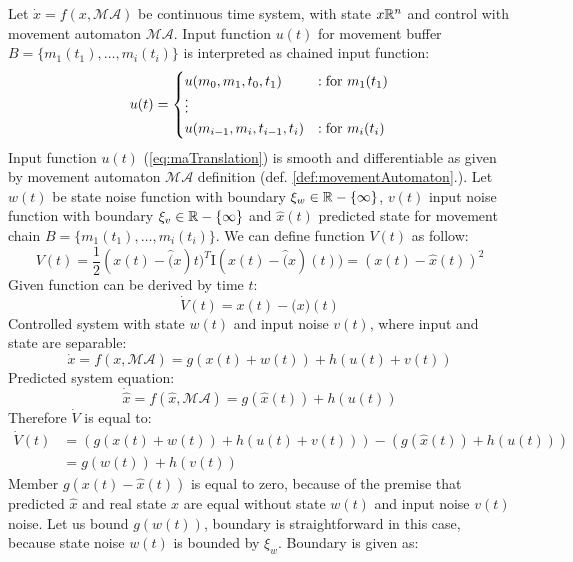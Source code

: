 \begin{dokaz}
Let $\dot{x}=f(x,\mathscr{MA})$ be continuous time system, with state $x\mathbb{R}^n$ and control with movement automaton $\mathscr{MA}$. Input function $u(t)$ for movement buffer $B=\{m_1(t_1),\dots,m_i(t_i)\}$ is interpreted as chained input function:
\begin{equation}\label{eq:maTranslation}
    u(t)=
    \begin{cases}
        u(m_0,m_1,t_0,t_1)&:\textnormal{for } m_1(t_1)\\
        \vdots&\\
        u(m_{i-1},m_{i},t_{i-1},t_{i})&:\textnormal{for } m_i(t_i)
    \end{cases}
\end{equation}
\noindent Input function $u(t)$ (\ref{eq:maTranslation}) is smooth and differentiable as given by movement automaton $\mathscr{MA}$  definition (def. \ref{def:movementAutomaton}.). Let $w(t)$ be state noise function with boundary $\xi_w\in\mathbb{R}-\{\infty\}$, $v(t)$ input noise function with boundary $\xi_v\in\mathbb{R}-\{\infty\}$ and $\hat{x}(t)$ predicted state for movement chain $B=\{m_1(t_1),\dots,m_i(t_i)\}$. We can define function $V(t)$ as follow:
\begin{equation}
    V(t) = \frac{1}{2} (x(t)-\hat(x){t})^T\text{I}(x(t)-\hat(x)(t)) = (x(t)-\hat{x}(t))^2
\end{equation}
\noindent Given function can be derived by time $t$: 
\begin{equation}
    \dot{V}(t) = x(t)-\hat(x)(t)
\end{equation}
\noindent Controlled system with state $w(t)$ and input noise $v(t)$, where input and state are separable:
\begin{equation}
    \dot{x}=f(x,\mathscr{MA}) = g(x(t)+ w(t)) + h(u(t)+ v(t))
\end{equation}
\noindent Predicted system equation:
\begin{equation}
    \dot{\hat{x}}=f(\hat{x},\mathscr{MA}) = g(\hat{x}(t)) + h(u(t))    
\end{equation}
\noindent Therefore $\dot{V}$ is equal to:
\begin{equation}
    \begin{split}  
    \dot{V}(t) &= (g(x(t)+ w(t)) + h(u(t)+ v(t))) - (g(\hat{x}(t)) + h(u(t)))\\
               &=  g(w(t)) + h(v(t))
    \end{split}
\end{equation}
\noindent Member $g(x(t)-\hat{x}(t))$ is equal to zero, because of the premise that predicted $\hat{x}$ and real state $x$ are equal without state $w(t)$ and input noise $v(t)$ noise. Let us bound $g(w(t))$, boundary is straightforward in this case, because state noise $w(t)$ is bounded by $\xi_w$. Boundary is given as:

\end{dokaz}
